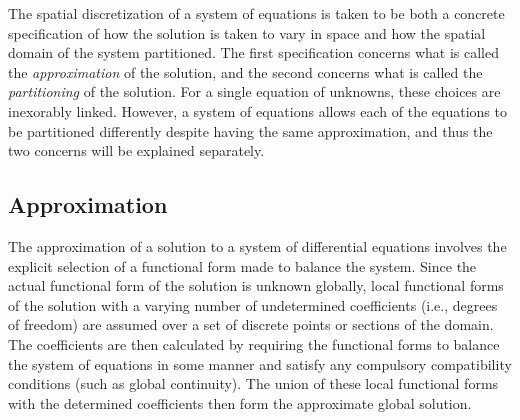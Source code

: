 \documentclass[12pt]{../UWMadThesis}
\begin{document}
The spatial discretization of a system of equations is taken to be both a concrete specification of how the solution is taken to vary in space and how the spatial domain of the system partitioned.
The first specification concerns what is called the \emph{approximation} of the solution, and the second concerns what is called the \emph{partitioning} of the solution.
For a single equation of unknowns, these choices are inexorably linked.
However, a system of equations allows each of the equations to be partitioned differently despite having the same approximation, and thus the two concerns will be explained separately.


\subsection{Approximation}

The approximation of a solution to a system of differential equations involves the explicit selection of a functional form made to balance the system.
Since the actual functional form of the solution is unknown globally, local functional forms of the solution with a varying number of undetermined coefficients (i.e., degrees of freedom) are assumed over a set of discrete points or sections of the domain.
The coefficients are then calculated by requiring the functional forms to balance the system of equations in some manner and satisfy any compulsory compatibility conditions (such as global continuity).
The union of these local functional forms with the determined coefficients then form the approximate global solution.
\end{document}
